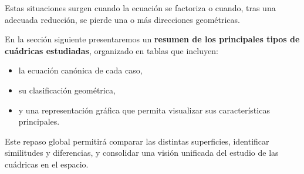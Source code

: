 \documentclass[11pt]{article}
\begin{document}
Estas situaciones surgen cuando la ecuación se factoriza o cuando, tras una adecuada reducción, se pierde una o más direcciones geométricas.

\medskip

En la sección siguiente presentaremos un \textbf{resumen de los principales tipos de cuádricas estudiadas}, organizado en tablas que incluyen:
\begin{itemize}
    \item la ecuación canónica de cada caso,
    \item su clasificación geométrica,
    \item y una representación gráfica que permita visualizar sus características principales.
\end{itemize}

Este repaso global permitirá comparar las distintas superficies, identificar similitudes y diferencias, y consolidar una visión unificada del estudio de las cuádricas en el espacio.
\end{document}
